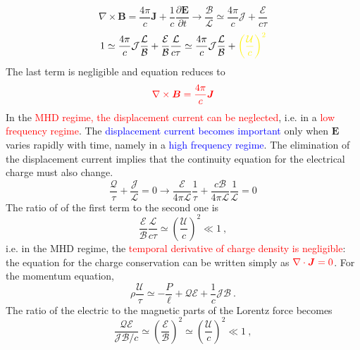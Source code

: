 \documentclass[12pt,a4paper]{article}
\renewcommand{\vec}[1]{\boldsymbol{#1}}
\begin{document}
\begin{equation*}
\nabla \times \vec{B} = \frac{4\pi}{c} \vec{J} +  \frac{1}{c}\frac{\partial \vec{E}}{\partial t} \longrightarrow \frac{\mathcal B}{\mathcal L} \simeq \frac{4\pi}{c} \mathcal{J} + \frac{\mathcal E}{c\tau} 
\end{equation*}
\begin{equation*}
1 \simeq \frac{4\pi}{c} \mathcal{J}  \frac{\mathcal L}{\mathcal B} +  \frac{\mathcal E}{\mathcal B}   \frac{\mathcal L}{c\tau} \simeq \frac{4\pi}{c} \mathcal{J}  \frac{\mathcal L}{\mathcal B} +\color{yellow} \left( \frac{\mathcal U}{c}  \right)^2
\end{equation*}
The last term is negligible and equation reduces to
\begin{equation}
\color{red} \nabla \times \vec{B} = \frac{4\pi}{c} \vec{J} 
\end{equation}
In the \textcolor{red}{MHD regime, the displacement current can be neglected}, i.e. in a \textcolor{red}{low frequency regime}. The \textcolor{blue}{displacement current becomes important} only when $\vec{E}$ varies rapidly with time, namely in a \textcolor{blue}{high frequency regime}.  The elimination of the displacement current implies that the continuity equation for the electrical charge must also change.
\begin{equation*}
\frac{\mathcal Q}{\tau} +\frac{\mathcal J}{\mathcal L} = 0 \longrightarrow \frac{\mathcal E}{4\pi \mathcal L}\frac{1}{\tau} +\frac{c\mathcal B}{4\pi \mathcal L}  \frac{1}{\mathcal L} = 0
\end{equation*}
The ratio of of the first term to the second one is
\begin{equation*}
\frac{\mathcal E}{\mathcal B} \frac{\mathcal L}{c\tau}  \simeq \left( \frac{\mathcal U}{c}  \right)^2 \ll 1 ~,
\end{equation*}
i.e. in the MHD regime, the \textcolor{red}{temporal derivative of charge density is negligible}: the equation for the charge conservation can be written simply as $\color{red} \nabla \cdot \vec{J} = 0$. For the momentum equation,
\begin{equation*}
\rho \frac{\mathcal U}{\tau} \simeq -\frac{P}{\ell} +{\mathcal Q}{\mathcal E} +\frac{1}{c} {\mathcal J}{\mathcal B} ~.
\end{equation*}
The ratio of the electric to the magnetic parts of the Lorentz force becomes
\begin{equation*}
\frac{{\mathcal Q}{\mathcal E}}{{\mathcal J}{\mathcal B}/c} \simeq \left(\frac{\mathcal E}{\mathcal B} \right)^2 \simeq \left(\frac{\mathcal U}{c} \right)^2 \ll 1 ~,
\end{equation*}
\end{document}
